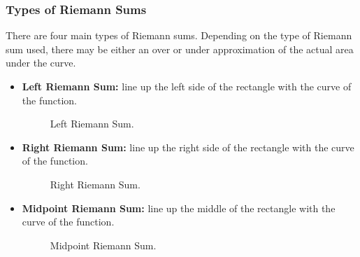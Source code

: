\subsubsection{Types of Riemann Sums}
There are four main types of Riemann sums. Depending on the type of Riemann sum used, there may be either an over or under approximation of the actual area under the curve.
\begin{itemize}
	\item \textbf{Left Riemann Sum:} line up the left side of the rectangle with the curve of the function.
	\begin{figure}[H]
		\centering
		\caption{Left Riemann Sum.}
	\end{figure}

	\item \textbf{Right Riemann Sum:} line up the right side of the rectangle with the curve of the function.
	\begin{figure}[H]
		\centering
		\caption{Right Riemann Sum.}
	\end{figure}

	\item \textbf{Midpoint Riemann Sum:} line up the middle of the rectangle with the curve of the function.
	\begin{figure}[H]
		\centering
		\caption{Midpoint Riemann Sum.}
	\end{figure}


\end{itemize}
